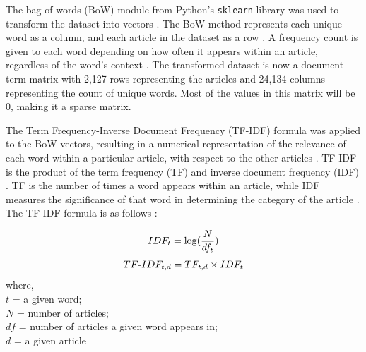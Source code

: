 \documentclass[12pt]{article}
\begin{document}
The bag-of-words (BoW) module from Python's \texttt{sklearn} library was used to transform the dataset into vectors \parencite{pedregosa2011scikit}. The BoW method represents each unique word as a column, and each article in the dataset as a row \parencite{manning_raghavan_schütze_2009_tf}. A frequency count is given to each word depending on how often it appears within an article, regardless of the word's context \parencite{manning_raghavan_schütze_2009_tf}. The transformed dataset is now a document-term matrix with 2,127 rows representing the articles and 24,134 columns representing the count of unique words. Most of the values in this matrix will be 0, making it a sparse matrix.

The Term Frequency-Inverse Document Frequency (TF-IDF) formula was applied to the BoW vectors, resulting in a numerical representation of the relevance of each word within a particular article, with respect to the other articles \parencite{manning_raghavan_schütze_2009_tf}. TF-IDF is the product of the term frequency (TF) and inverse document frequency (IDF) \parencite{manning_raghavan_schütze_2009_tf}. TF is the number of times a word appears within an article, while IDF measures the significance of that word in determining the category of the article \parencite{manning_raghavan_schütze_2009_tf}. The TF-IDF formula is as follows \parencite{manning_raghavan_schütze_2009_tf}:

\begin{equation}
  IDF_t = \log (\frac{N}{df_t})\\
\end{equation}
\begin{equation}
  TF\text{-}IDF_{t,d} = TF_{t,d} \times IDF_t\\
\end{equation}
where,\\
$t$ = a given word; \\
$N$ = number of articles; \\
$df$ = number of articles a given word appears in; \\
$d$ = a given article\\
\end{document}
